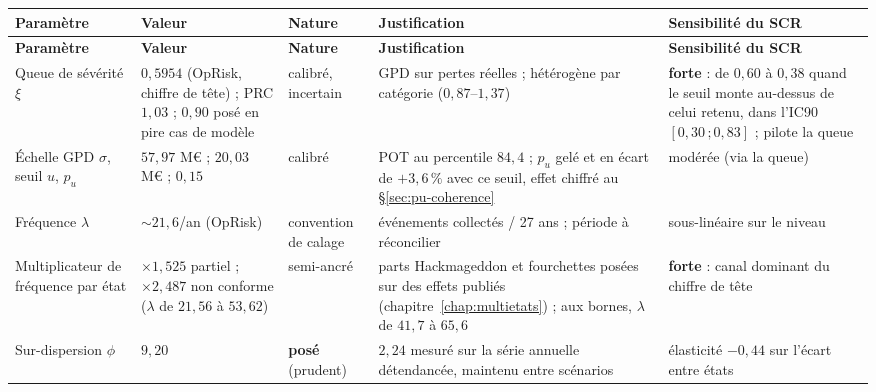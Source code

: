 \vspace{0.25cm}
{\footnotesize
\renewcommand{\arraystretch}{1.28}
\begin{longtable}{@{}>{\raggedright\arraybackslash}p{2.7cm}
                    >{\raggedright\arraybackslash}p{2.6cm}
                    >{\raggedright\arraybackslash}p{1.7cm}
                    >{\raggedright\arraybackslash}p{4.0cm}
                    >{\raggedright\arraybackslash}p{3.6cm}@{}}
\toprule
\textbf{Paramètre} & \textbf{Valeur} & \textbf{Nature} & \textbf{Justification} & \textbf{Sensibilité du SCR} \\
\midrule
\endfirsthead
\toprule
\textbf{Paramètre} & \textbf{Valeur} & \textbf{Nature} & \textbf{Justification} & \textbf{Sensibilité du SCR} \\
\midrule
\endhead
\bottomrule
\endlastfoot
Queue de sévérité $\xi$ & $0{,}5954$ (OpRisk, chiffre de tête) ; PRC $1{,}03$ ; $0{,}90$ posé en pire cas de modèle & calibré, incertain & GPD sur pertes réelles ; hétérogène par catégorie ($0{,}87$--$1{,}37$) & \textbf{forte} : de $0{,}60$ à $0{,}38$ quand le seuil monte au-dessus de celui retenu, dans l'IC90 $[0{,}30\,;0{,}83]$ ; pilote la queue \\
Échelle GPD $\sigma$, seuil $u$, $p_u$ & $57{,}97$ M\euro{} ; $20{,}03$ M\euro{} ; $0{,}15$ & calibré & POT au percentile $84{,}4$ ; $p_u$ gelé et en écart de $+3{,}6\,\%$ avec ce seuil, effet chiffré au \S\ref{sec:pu-coherence} & modérée (via la queue) \\
Fréquence $\lambda$ & ${\sim}21{,}6$/an (OpRisk) & convention de calage & événements collectés / 27 ans ; période à réconcilier & sous-linéaire sur le niveau \\
Multiplicateur de fréquence par état & $\times 1{,}525$ partiel ; $\times 2{,}487$ non conforme ($\lambda$ de $21{,}56$ à $53{,}62$) & semi-ancré & parts Hackmageddon et fourchettes posées sur des effets publiés (chapitre~\ref{chap:multietats}) ; aux bornes, $\lambda$ de $41{,}7$ à $65{,}6$ & \textbf{forte} : canal dominant du chiffre de tête \\
Sur-dispersion $\phi$ & $9{,}20$ & \textbf{posé} (prudent) & $2{,}24$ mesuré sur la série annuelle détendancée, maintenu entre scénarios & élasticité $-0{,}44$ sur l'écart entre états \\

\end{longtable}}
